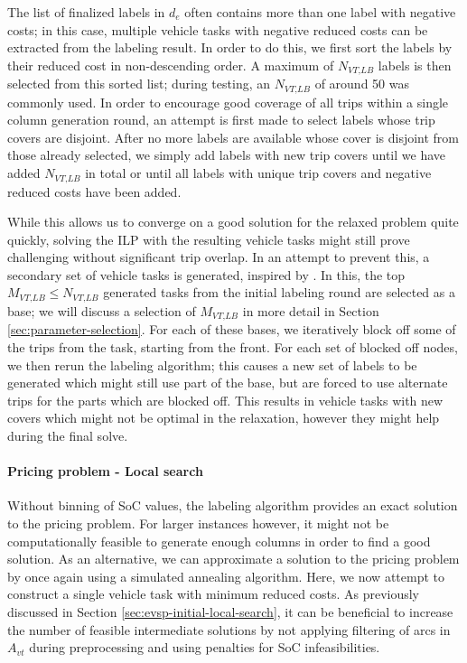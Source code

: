 \documentclass[]{article}
\begin{document}
The list of finalized labels in $d_e$ often contains more than one label with negative costs; in this case, multiple vehicle tasks with negative reduced costs can be extracted from the labeling result. In order to do this, we first sort the labels by their reduced cost in non-descending order. A maximum of $N_{\textit{VT,LB}}$ labels is then selected from this sorted list; during testing, an $N_{\textit{VT,LB}}$ of around 50 was commonly used. In order to encourage good coverage of all trips within a single column generation round, an attempt is first made to select labels whose trip covers are disjoint. After no more labels are available whose cover is disjoint from those already selected, we simply add labels with new trip covers until we have added $N_{\textit{VT,LB}}$ in total or until all labels with unique trip covers and negative reduced costs have been added. 

While this allows us to converge on a good solution for the relaxed problem quite quickly, solving the ILP with the resulting vehicle tasks might still prove challenging without significant trip overlap. In an attempt to prevent this, a secondary set of vehicle tasks is generated, inspired by \citet{Guido2009}. In this, the top $M_{\textit{VT,LB}} \leq N_{\textit{VT,LB}}$ generated tasks from the initial labeling round are selected as a base; we will discuss a selection of $M_{\textit{VT,LB}}$ in more detail in Section \ref{sec:parameter-selection}. For each of these bases, we iteratively block off some of the trips from the task, starting from the front. For each set of blocked off nodes, we then rerun the labeling algorithm; this causes a new set of labels to be generated which might still use part of the base, but are forced to use alternate trips for the parts which are blocked off. This results in vehicle tasks with new covers which might not be optimal in the relaxation, however they might help during the final solve.

\paragraph{Pricing problem - Local search} \label{sec:evsp-pricing-local-search}
Without binning of SoC values, the labeling algorithm provides an exact solution to the pricing problem. For larger instances however, it might not be computationally feasible to generate enough columns in order to find a good solution. As an alternative, we can approximate a solution to the pricing problem by once again using a simulated annealing algorithm. Here, we now attempt to construct a single vehicle task with minimum reduced costs. As previously discussed in Section \ref{sec:evsp-initial-local-search}, it can be beneficial to increase the number of feasible intermediate solutions by not applying filtering of arcs in $A_{vt}$ during preprocessing and using penalties for SoC infeasibilities.
\end{document}
